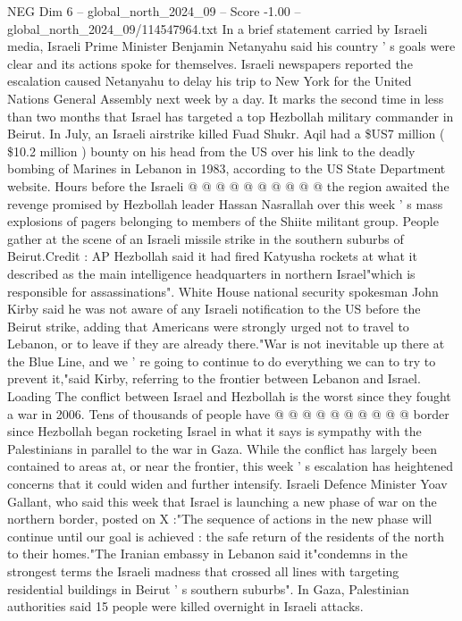 \begin{textsample}{NEG Dim 6 – global\_north\_2024\_09 – Score -1.00 – global\_north\_2024\_09/114547964.txt}
In a brief statement carried by Israeli media, Israeli Prime Minister Benjamin Netanyahu said his country ' s goals were clear and its actions spoke for themselves.
Israeli newspapers reported the escalation caused Netanyahu to delay his trip to New York for the United Nations General Assembly next week by a day.
It marks the second time in less than two months that Israel has targeted a top Hezbollah military commander in Beirut.
In July, an Israeli airstrike killed Fuad Shukr.
Aqil had a \$US7 million ( \$10.2 million ) bounty on his head from the US over his link to the deadly bombing of Marines in Lebanon in 1983, according to the US State Department website.
Hours before the Israeli @ @ @ @ @ @ @ @ @ @ the region awaited the revenge promised by Hezbollah leader Hassan Nasrallah over this week ' s mass explosions of pagers belonging to members of the Shiite militant group.
People gather at the scene of an Israeli missile strike in the southern suburbs of Beirut.Credit : AP Hezbollah said it had fired Katyusha rockets at what it described as the main intelligence headquarters in northern Israel"which is responsible for assassinations".
White House national security spokesman John Kirby said he was not aware of any Israeli notification to the US before the Beirut strike, adding that Americans were strongly urged not to travel to Lebanon, or to leave if they are already there."War is not inevitable up there at the Blue Line, and we ' re going to continue to do everything we can to try to prevent it,"said Kirby, referring to the frontier between Lebanon and Israel.
Loading The conflict between Israel and Hezbollah is the worst since they fought a war in 2006.
Tens of thousands of people have @ @ @ @ @ @ @ @ @ @ border since Hezbollah began rocketing Israel in what it says is sympathy with the Palestinians in parallel to the war in Gaza.
While the conflict has largely been contained to areas at, or near the frontier, this week ' s escalation has heightened concerns that it could widen and further intensify.
Israeli Defence Minister Yoav Gallant, who said this week that Israel is launching a new phase of war on the northern border, posted on X :"The sequence of actions in the new phase will continue until our goal is achieved : the safe return of the residents of the north to their homes."The Iranian embassy in Lebanon said it"condemns in the strongest terms the Israeli madness that crossed all lines with targeting residential buildings in Beirut ' s southern suburbs".
In Gaza, Palestinian authorities said 15 people were killed overnight in Israeli attacks.

\end{textsample}
